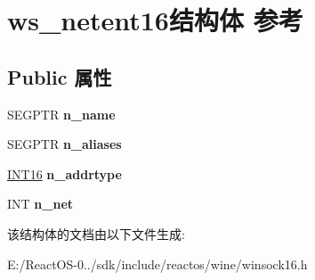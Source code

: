 \hypertarget{structws__netent16}{}\section{ws\+\_\+netent16结构体 参考}
\label{structws__netent16}
\subsection*{Public 属性}
\begin{DoxyCompactItemize}
\item 
\mbox{\label{structws__netent16_ad402844be92a612cb63a1e7ce9d7faf5}} 
S\+E\+G\+P\+TR {\bfseries n\+\_\+name}
\item 
\mbox{\label{structws__netent16_a312cd742f66cb9c4ff380b5ddf643603}} 
S\+E\+G\+P\+TR {\bfseries n\+\_\+aliases}
\item 
\mbox{\label{structws__netent16_a862ec4c317365939a9a488f3bb4590df}} 
\hyperlink{_processor_bind_8h_a30f500129d8c688af07726d5d34ce52d}{I\+N\+T16} {\bfseries n\+\_\+addrtype}
\item 
\mbox{\label{structws__netent16_a60e76ff00f7bfcf01633b2cf44c588e6}} 
I\+NT {\bfseries n\+\_\+net}
\end{DoxyCompactItemize}


该结构体的文档由以下文件生成\+:\begin{DoxyCompactItemize}
\item 
E\+:/\+React\+O\+S-\/0../sdk/include/reactos/wine/winsock16.\+h\end{DoxyCompactItemize}
